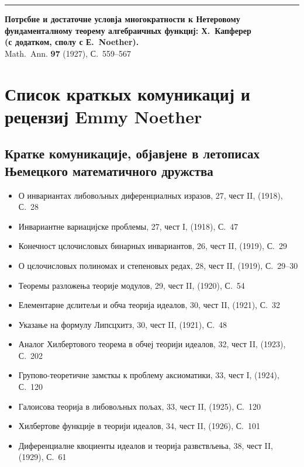 \documentclass[11pt]{article}
\newcommand{\foreign}[1]{#1}
\begin{document}
\vspace{1em}
\noindent\rule{\textwidth}{0.4pt}
\vspace{0.5em}

\noindent\textbf{Потрєбне и достаточне условја многократности к Нетеровому}\\
\textbf{фундаменталному теорему алгебраичных функциј: Х.\ Капферер}\\
\textbf{(с додатком, сполу с Е.\ Noether).}\\
\foreign{Math.\ Ann.} \textbf{97} (1927), С.~559--567

\newpage
\section*{Список краткых комуникациј и рецензиј Emmy Noether}

\subsection*{Кратке комуникације, објавјене в летописах Њемецкого математичного дружства}

\begin{itemize}[leftmargin=1.5em,itemsep=0.2em]
\item О инвариантах либовољных диференциалных изразов, 27, чест II, (1918), С.~28
\item Инвариантне вариацијске проблемы, 27, чест I, (1918), С.~47
\item Конечност цєлочисловых бинарных инвариантов, 26, чест II, (1919), С.~29
\item О цєлочисловых полиномах и степеновых редах, 28, чест II, (1919), С.~29--30
\item Теоремы разложења теорије модулов, 29, чест II, (1920), С.~54
\item Елементарне дєлитељи и обча теорија идеалов, 30, чест II, (1921), С.~32
\item Указање на формулу Липсцхитз, 30, чест II, (1921), С.~48
\item Аналог Хилбертового теорема в обчеј теорији идеалов, 32, чест II, (1923), С.~202
\item Групово-теоретичне замєткы к проблему аксиоматики, 33, чест I, (1924), С.~120
\item Галоисова теорија в либовољных пољах, 33, чест II, (1925), С.~120
\item Хилбертове функције в теорији идеалов, 34, чест II, (1926), С.~101
\item Диференциалне квоциенты идеалов и теорија развєтвљења, 38, чест II, (1929), С.~61
\end{itemize}
\end{document}
